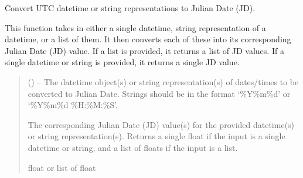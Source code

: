 \documentclass[letterpaper,10pt,english]{sphinxmanual}
\begin{document}
\begin{fulllineitems}
\label{\detokenize{fspsim.utils:fspsim.utils.Conversions.utc_to_jd}}
\pysigstartsignatures
{}
\pysigstopsignatures
\sphinxAtStartPar
Convert UTC datetime or string representations to Julian Date (JD).

\sphinxAtStartPar
This function takes in either a single datetime, string representation of a datetime, or a list of them. It then
converts each of these into its corresponding Julian Date (JD) value. If a list is provided, it returns a list of JD
values. If a single datetime or string is provided, it returns a single JD value.
\begin{quote}\begin{description}
\sphinxAtStartPar
{} (\sphinxstyleliteralemphasis{\sphinxupquote{, }}) – The datetime object(s) or string representation(s) of dates/times to be converted to Julian Date.
Strings should be in the format ‘\%Y\sphinxhyphen{}\%m\sphinxhyphen{}\%d’ or ‘\%Y\sphinxhyphen{}\%m\sphinxhyphen{}\%d \%H:\%M:\%S’.

\sphinxAtStartPar
The corresponding Julian Date (JD) value(s) for the provided datetime(s) or string representation(s).
Returns a single float if the input is a single datetime or string, and a list of floats if the input is a list.

\sphinxAtStartPar
float or list of float

\end{description}\end{quote}

\end{fulllineitems}

\end{document}
